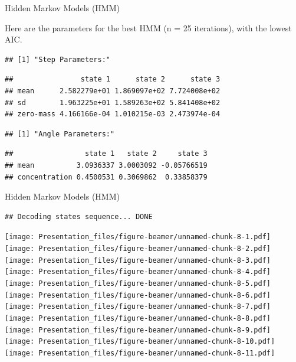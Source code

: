\documentclass[
  ignorenonframetext,
]{beamer}
\begin{document}
\begin{frame}[fragile]{Hidden Markov Models (HMM)}
\protect\hypertarget{hidden-markov-models-hmm-2}{}

Here are the parameters for the best HMM (n = 25 iterations), with the
lowest AIC.

\begin{verbatim}
## [1] "Step Parameters:"
\end{verbatim}

\begin{verbatim}
##                state 1      state 2      state 3
## mean      2.582279e+01 1.869097e+02 7.724008e+02
## sd        1.963225e+01 1.589263e+02 5.841408e+02
## zero-mass 4.166166e-04 1.010215e-03 2.473974e-04
\end{verbatim}

\begin{verbatim}
## [1] "Angle Parameters:"
\end{verbatim}

\begin{verbatim}
##                 state 1   state 2     state 3
## mean          3.0936337 3.0003092 -0.05766519
## concentration 0.4500531 0.3069862  0.33858379
\end{verbatim}

\end{frame}

\begin{frame}[fragile]{Hidden Markov Models (HMM)}
\protect\hypertarget{hidden-markov-models-hmm-3}{}

\begin{verbatim}
## Decoding states sequence... DONE
\end{verbatim}

\texttt{[image: Presentation\_files/figure-beamer/unnamed-chunk-8-1.pdf]}
\texttt{[image: Presentation\_files/figure-beamer/unnamed-chunk-8-2.pdf]}
\texttt{[image: Presentation\_files/figure-beamer/unnamed-chunk-8-3.pdf]}
\texttt{[image: Presentation\_files/figure-beamer/unnamed-chunk-8-4.pdf]}
\texttt{[image: Presentation\_files/figure-beamer/unnamed-chunk-8-5.pdf]}
\texttt{[image: Presentation\_files/figure-beamer/unnamed-chunk-8-6.pdf]}
\texttt{[image: Presentation\_files/figure-beamer/unnamed-chunk-8-7.pdf]}
\texttt{[image: Presentation\_files/figure-beamer/unnamed-chunk-8-8.pdf]}
\texttt{[image: Presentation\_files/figure-beamer/unnamed-chunk-8-9.pdf]}
\texttt{[image: Presentation\_files/figure-beamer/unnamed-chunk-8-10.pdf]}
\texttt{[image: Presentation\_files/figure-beamer/unnamed-chunk-8-11.pdf]}

\end{frame}
\end{document}
